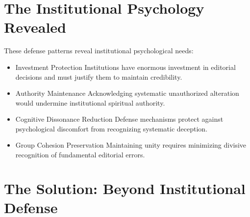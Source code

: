 \documentclass[11pt,twoside]{book}
\begin{document}
\section*{The Institutional Psychology Revealed}
\label{sec:org03fcd35}

These defense patterns reveal institutional psychological needs:
\begin{itemize}
\item Investment Protection
\label{sec:orgf770d1a}
Institutions have enormous investment in editorial decisions and must justify them to maintain credibility.
\item Authority Maintenance
\label{sec:org95a6954}
Acknowledging systematic unauthorized alteration would undermine institutional spiritual authority.
\item Cognitive Dissonance Reduction
\label{sec:org55027b5}
Defense mechanisms protect against psychological discomfort from recognizing systematic deception.
\item Group Cohesion Preservation
\label{sec:org0f42af4}
Maintaining unity requires minimizing divisive recognition of fundamental editorial errors.
\end{itemize}
\section*{The Solution: Beyond Institutional Defense}
\label{sec:orgb45cca1}
\end{document}
